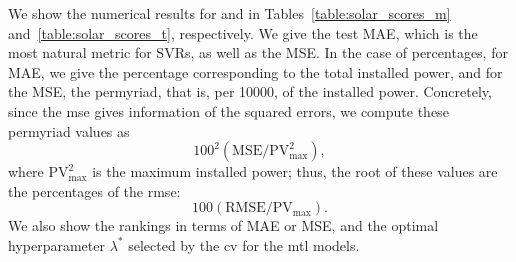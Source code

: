 
We show the numerical results for  and  in Tables~\ref{table:solar_scores_m} and~\ref{table:solar_scores_t}, respectively. We give the test MAE, which is the most natural metric for SVRs, as well as the MSE. 
In the case of percentages, for MAE, we give the percentage corresponding to the total installed power, and for the MSE, the permyriad, that is, per \num{10000}, of the installed power. Concretely, since the \acrshort{mse} gives information of the squared errors, we compute these permyriad values as 
$$ 100^2 (\text{MSE}/\text{PV}_\text{max}^2) ,$$
where $\text{PV}_\text{max}^2$ is the maximum installed power; thus, the root of these values are the percentages of the \acrfull{rmse}:
$$ 100 (\text{RMSE}/\text{PV}_\text{max}) .$$
%
We also show the rankings in terms of MAE or MSE, and the optimal hyperparameter $\lambda^*$ selected by the \acrshort{cv} for the \acrshort{mtl} models.
%


